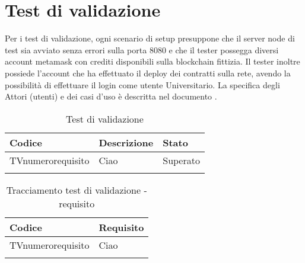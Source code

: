 \documentclass[PianoDiQualifica.tex]{subfiles}
\begin{document}
\chapter{Test di validazione}

Per i test di validazione, ogni scenario di setup presuppone che il server node di test sia avviato senza errori sulla porta 8080 e che il tester possegga diversi account metamask con crediti disponibili sulla blockchain fittizia.
Il tester inoltre possiede l’account che ha effettuato il deploy dei contratti sulla rete, avendo la possibilità di effettuare il login come utente Universitario.
La specifica degli Attori (utenti) e dei casi d’uso è descritta nel documento \adr \vrquattro.

\begin{longtable}[H]{P{2cm}P{8.5cm}P{3cm}}
	\color{CHeaderText}\textbf{Codice} & 
	\color{CHeaderText}\textbf{Descrizione} & 
	\color{CHeaderText}\textbf{Stato}\\
	\endhead
	TVnumerorequisito & Ciao & Superato \\ 
	\hiderowcolors
	\caption{Test di validazione}
\end{longtable}

\begin{longtable}[H]{P{6.5cm}P{7cm}}
	\color{CHeaderText}\textbf{Codice} & 
	\color{CHeaderText}\textbf{Requisito} \\
	\endhead
	TVnumerorequisito & Ciao \\ 
	\hiderowcolors
	\caption{Tracciamento test di validazione - requisito}
\end{longtable}
\end{document}
